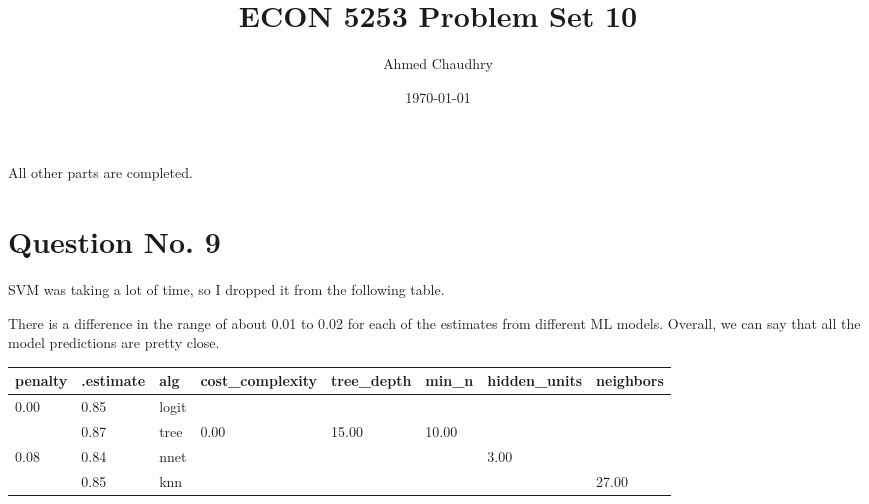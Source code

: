 \documentclass{article}
\title{ECON 5253 Problem Set 10}
\author{Ahmed Chaudhry}
\date{\today}
\begin{document}
\maketitle

All other parts are completed.

\section{Question No. 9}

SVM was taking a lot of time, so I dropped it from the following table.

There is a difference in the range of about 0.01 to 0.02 for each of the estimates from different ML models. Overall, we can say that all the model predictions are pretty close.

\begin{table}[hbt!]
\centering
\begin{tabular}[t]{llllllll}
\toprule
penalty & .estimate & alg & cost\_complexity & tree\_depth & min\_n & hidden\_units & neighbors\\
\midrule
0.00 & 0.85 & logit &  &  &  &  & \\
 & 0.87 & tree & 0.00 & 15.00 & 10.00 &  & \\
0.08 & 0.84 & nnet &  &  &  & 3.00 & \\
 & 0.85 & knn &  &  &  &  & 27.00\\
\bottomrule
\end{tabular}
\end{table}
\end{document}
